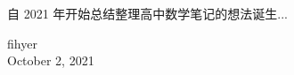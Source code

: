 \documentclass[../main.tex]{subfiles}
\begin{document}

    自 2021 年开始总结整理高中数学笔记的想法诞生...

    \vskip 1.5cm

    \begin{flushright}
    fihyer\\
    October 2, 2021
    \end{flushright}
\end{document}
